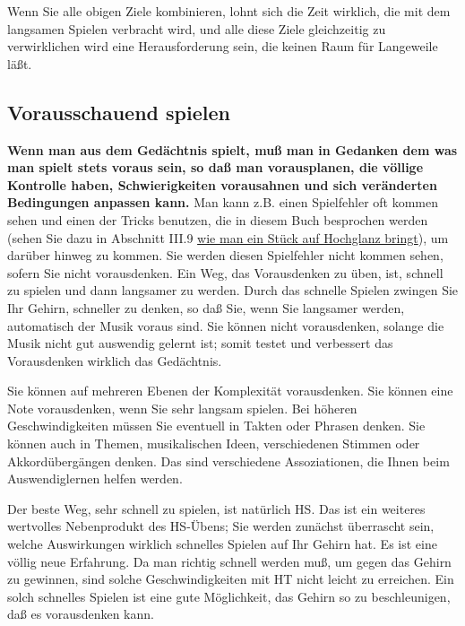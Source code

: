 Wenn Sie alle obigen Ziele kombinieren, lohnt sich die Zeit wirklich, die mit dem langsamen Spielen verbracht wird, und alle diese Ziele gleichzeitig zu verwirklichen wird eine Herausforderung sein, die keinen Raum für Langeweile läßt.
 

\subsection{Vorausschauend spielen}\hypertarget{c1iii6i}{}

\textbf{Wenn man aus dem Gedächtnis spielt, muß man in Gedanken dem was man spielt stets voraus sein, so daß man vorausplanen, die völlige Kontrolle haben, Schwierigkeiten vorausahnen und sich veränderten Bedingungen anpassen kann.}
Man kann z.B. einen Spielfehler oft kommen sehen und einen der Tricks benutzen, die in diesem Buch besprochen werden (sehen Sie dazu in Abschnitt III.9 \hyperlink{c1iii9}{wie man ein Stück auf Hochglanz bringt}), um darüber hinweg zu kommen.
Sie werden diesen Spielfehler nicht kommen sehen, sofern Sie nicht vorausdenken.
Ein Weg, das Vorausdenken zu üben, ist, schnell zu spielen und dann langsamer zu werden.
Durch das schnelle Spielen zwingen Sie Ihr Gehirn, schneller zu denken, so daß Sie, wenn Sie langsamer werden, automatisch der Musik voraus sind.
Sie können nicht vorausdenken, solange die Musik nicht gut auswendig gelernt ist; somit testet und verbessert das Vorausdenken wirklich das Gedächtnis.

Sie können auf mehreren Ebenen der Komplexität vorausdenken.
Sie können eine Note vorausdenken, wenn Sie sehr langsam spielen.
Bei höheren Geschwindigkeiten müssen Sie eventuell in Takten oder Phrasen denken.
Sie können auch in Themen, musikalischen Ideen, verschiedenen Stimmen oder Akkordübergängen denken.
Das sind verschiedene Assoziationen, die Ihnen beim Auswendiglernen helfen werden.

Der beste Weg, sehr schnell zu spielen, ist natürlich HS.
Das ist ein weiteres wertvolles Nebenprodukt des HS-Übens; Sie werden zunächst überrascht sein, welche Auswirkungen wirklich schnelles Spielen auf Ihr Gehirn hat.
Es ist eine völlig neue Erfahrung.
Da man richtig schnell werden muß, um gegen das Gehirn zu gewinnen, sind solche Geschwindigkeiten mit HT nicht leicht zu erreichen.
Ein solch schnelles Spielen ist eine gute Möglichkeit, das Gehirn so zu beschleunigen, daß es vorausdenken kann.



